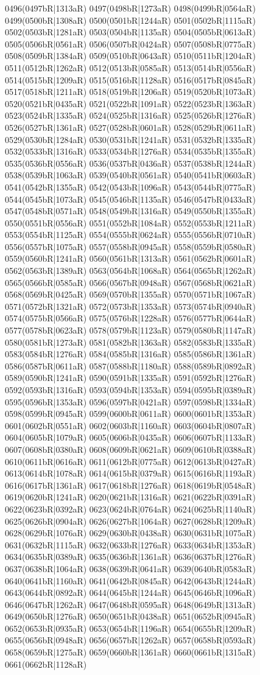 0496(0497bR|1313aR) 0497(0498bR|1273aR) 0498(0499bR|0564aR) 0499(0500bR|1308aR) 0500(0501bR|1244aR) 0501(0502bR|1115aR) 0502(0503bR|1281aR) 0503(0504bR|1135aR) 0504(0505bR|0613aR) 0505(0506bR|0561aR) 0506(0507bR|0424aR) 0507(0508bR|0775aR) 0508(0509bR|1384aR) 0509(0510bR|0643aR) 0510(0511bR|1204aR) 0511(0512bR|1262aR) 0512(0513bR|0585aR) 0513(0514bR|0556aR) 0514(0515bR|1209aR) 0515(0516bR|1128aR) 0516(0517bR|0845aR) 0517(0518bR|1211aR) 0518(0519bR|1206aR) 0519(0520bR|1073aR) 0520(0521bR|0435aR) 0521(0522bR|1091aR) 0522(0523bR|1363aR) 0523(0524bR|1335aR) 0524(0525bR|1316aR) 0525(0526bR|1276aR) 0526(0527bR|1361aR) 0527(0528bR|0601aR) 0528(0529bR|0611aR) 0529(0530bR|1284aR) 0530(0531bR|1241aR) 0531(0532bR|1335aR) 0532(0533bR|1316aR) 0533(0534bR|1276aR) 0534(0535bR|1355aR) 0535(0536bR|0556aR) 0536(0537bR|0436aR) 0537(0538bR|1244aR) 0538(0539bR|1063aR) 0539(0540bR|0561aR) 0540(0541bR|0603aR) 0541(0542bR|1355aR) 0542(0543bR|1096aR) 0543(0544bR|0775aR) 0544(0545bR|1073aR) 0545(0546bR|1135aR) 0546(0547bR|0433aR) 0547(0548bR|0571aR) 0548(0549bR|1316aR) 0549(0550bR|1355aR) 0550(0551bR|0556aR) 0551(0552bR|1084aR) 0552(0553bR|1211aR) 0553(0554bR|1125aR) 0554(0555bR|0624aR) 0555(0556bR|0710aR) 0556(0557bR|1075aR) 0557(0558bR|0945aR) 0558(0559bR|0580aR) 0559(0560bR|1241aR) 0560(0561bR|1313aR) 0561(0562bR|0601aR) 0562(0563bR|1389aR) 0563(0564bR|1068aR) 0564(0565bR|1262aR) 0565(0566bR|0585aR) 0566(0567bR|0948aR) 0567(0568bR|0621aR) 0568(0569bR|0425aR) 0569(0570bR|1355aR) 0570(0571bR|1067aR) 0571(0572bR|1321aR) 0572(0573bR|1353aR) 0573(0574bR|0940aR) 0574(0575bR|0566aR) 0575(0576bR|1228aR) 0576(0577bR|0644aR) 0577(0578bR|0623aR) 0578(0579bR|1123aR) 0579(0580bR|1147aR) 0580(0581bR|1273aR) 0581(0582bR|1363aR) 0582(0583bR|1335aR) 0583(0584bR|1276aR) 0584(0585bR|1316aR) 0585(0586bR|1361aR) 0586(0587bR|0611aR) 0587(0588bR|1180aR) 0588(0589bR|0892aR) 0589(0590bR|1241aR) 0590(0591bR|1335aR) 0591(0592bR|1276aR) 0592(0593bR|1316aR) 0593(0594bR|1353aR) 0594(0595bR|0389aR) 0595(0596bR|1353aR) 0596(0597bR|0421aR) 0597(0598bR|1334aR) 0598(0599bR|0945aR) 0599(0600bR|0611aR) 0600(0601bR|1353aR) 0601(0602bR|0551aR) 0602(0603bR|1160aR) 0603(0604bR|0807aR) 0604(0605bR|1079aR) 0605(0606bR|0435aR) 0606(0607bR|1133aR) 0607(0608bR|0380aR) 0608(0609bR|0621aR) 0609(0610bR|0388aR) 0610(0611bR|0616aR) 0611(0612bR|0775aR) 0612(0613bR|0427aR) 0613(0614bR|1078aR) 0614(0615bR|0379aR) 0615(0616bR|1193aR) 0616(0617bR|1361aR) 0617(0618bR|1276aR) 0618(0619bR|0548aR) 0619(0620bR|1241aR) 0620(0621bR|1316aR) 0621(0622bR|0391aR) 0622(0623bR|0392aR) 0623(0624bR|0764aR) 0624(0625bR|1140aR) 0625(0626bR|0904aR) 0626(0627bR|1064aR) 0627(0628bR|1209aR) 0628(0629bR|1076aR) 0629(0630bR|0438aR) 0630(0631bR|1075aR) 0631(0632bR|1115aR) 0632(0633bR|1276aR) 0633(0634bR|1353aR) 0634(0635bR|0389aR) 0635(0636bR|1361aR) 0636(0637bR|1276aR) 0637(0638bR|1064aR) 0638(0639bR|0641aR) 0639(0640bR|0583aR) 0640(0641bR|1160aR) 0641(0642bR|0845aR) 0642(0643bR|1244aR) 0643(0644bR|0892aR) 0644(0645bR|1244aR) 0645(0646bR|1096aR) 0646(0647bR|1262aR) 0647(0648bR|0595aR) 0648(0649bR|1313aR) 0649(0650bR|1276aR) 0650(0651bR|0438aR) 0651(0652bR|0945aR) 0652(0653bR|0935aR) 0653(0654bR|1196aR) 0654(0655bR|1209aR) 0655(0656bR|0948aR) 0656(0657bR|1262aR) 0657(0658bR|0593aR) 0658(0659bR|1275aR) 0659(0660bR|1361aR) 0660(0661bR|1315aR) 0661(0662bR|1128aR) 